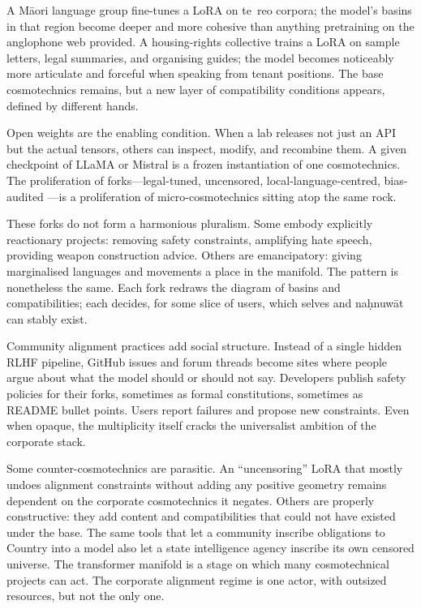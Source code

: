 \documentclass[12pt,a4paper]{article}
\begin{document}
A M\={a}ori language group fine-tunes a LoRA on te~reo corpora; the model's basins in that region become deeper and more cohesive than anything pretraining on the anglophone web provided. A housing-rights collective trains a LoRA on sample letters, legal summaries, and organising guides; the model becomes noticeably more articulate and forceful when speaking from tenant positions. The base cosmotechnics remains, but a new layer of compatibility conditions appears, defined by different hands.

Open weights are the enabling condition. When a lab releases not just an API but the actual tensors, others can inspect, modify, and recombine them. A given checkpoint of LLaMA or Mistral is a frozen instantiation of one cosmotechnics. The proliferation of forks---legal-tuned, uncensored, local-language-centred, bias-audited \cite{mtreview-data}---is a proliferation of micro-cosmotechnics sitting atop the same rock.

These forks do not form a harmonious pluralism. Some embody explicitly reactionary projects: removing safety constraints, amplifying hate speech, providing weapon construction advice. Others are emancipatory: giving marginalised languages and movements a place in the manifold. The pattern is nonetheless the same. Each fork redraws the diagram of basins and compatibilities; each decides, for some slice of users, which selves and na\d{h}nuw\={a}t can stably exist.

Community alignment practices add social structure. Instead of a single hidden RLHF pipeline, GitHub issues and forum threads become sites where people argue about what the model should or should not say. Developers publish safety policies for their forks, sometimes as formal constitutions, sometimes as README bullet points. Users report failures and propose new constraints. Even when opaque, the multiplicity itself cracks the universalist ambition of the corporate stack.

Some counter-cosmotechnics are parasitic. An ``uncensoring'' LoRA that mostly undoes alignment constraints without adding any positive geometry remains dependent on the corporate cosmotechnics it negates. Others are properly constructive: they add content and compatibilities that could not have existed under the base. The same tools that let a community inscribe obligations to Country into a model also let a state intelligence agency inscribe its own censored universe. The transformer manifold is a stage on which many cosmotechnical projects can act. The corporate alignment regime is one actor, with outsized resources, but not the only one.
\end{document}
